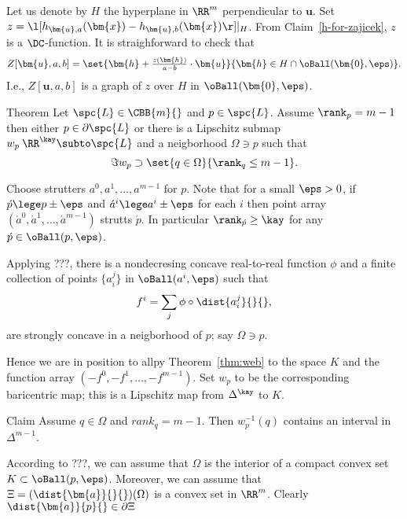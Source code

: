 Let us denote by $H$ the hyperplane in $\RR^m$ perpendicular to $\bm{u}$.
Set $z=\l[h_{\bm{u}, a}(\bm{x})-h_{\bm{u}, b}(\bm{x})\r]|_H$.
From Claim~\ref{h-for-zajicek}, $z$ is a $\DC$-function.
It is straighforward to check that
$$ Z[\bm{u},a,b]
=\set{\bm{h}+\tfrac{z(\bm{h})}{a-b}\cdot\bm{u}}{\bm{h}\in H\cap\oBall(\bm{0},\eps)}.$$
I.e., $Z[\bm{u},a,b]$ is a graph of $z$ over $H$ in $\oBall(\bm{0},\eps)$.
\claimqeds
















\begin{thm}{Theorem}
Let $\spc{L}\in\CBB{m}{}$ and $p\in\spc{L}$.
Assume $\rank_p=m-1$ then either $p\in\partial\spc{L}$
or there is a Lipschitz submap 
$w_p\:\RR^\kay\subto\spc{L}$
and a neigborhood $\Omega\ni p$
such that 
$$\Im w_p
\supset
\set{q\in \Omega}{\rank_q\le m-1}.
$$ 
\end{thm}

Choose strutters $a^0,a^1,\dots,a^{m-1}$ for $p$.
Note that for a small $\eps>0$,
if  $\acute p\lege p\pm\eps$ and $\acute a^i\lege a^i\pm\eps$ for each $i$
then point array $(\acute a^0,\acute a^1,\dots,\acute a^{m-1})$ strutts $\acute p$.
In particular $\rank_{\acute p}\ge \kay$ for any $\acute p\in\oBall(p,\eps)$.

Applying ???,
there is a nondecresing concave real-to-real function $\phi$ and 
a finite collection of points  $\{a^j_i\}$ in $\oBall(a^i,\eps)$
such that 
$$f^i=\sum_j\phi\circ\dist{a^j_i}{}{},$$
are strongly concave in a neigborhood of $p$; say $\Omega\ni p$.

Hence we are in position to allpy Theorem~\ref{thm:web} to the space $K$ 
and the function array $(-f^0,-f^1,\dots,-f^{m-1})$.
Set $w_p$ to be the corresponding baricentric map;
this is a Lipschitz map from $\Delta^\kay$ to $K$.

\begin{clm}{Claim}
Assume $q\in \Omega$ and $rank_q=m-1$.
Then $w_p^{-1}(q)$ contains an interval in $\Delta^{m-1}$. 
\end{clm}
 

According to ???,
we can assume that $\Omega$ is the interior of 
a compact convex set $K\subset \oBall(p,\eps)$.
Moreover, 
we can assume that $\Xi=(\dist{\bm{a}}{}{})(\Omega)$ is a convex set in $\RR^m$.
Clearly $\dist{\bm{a}}{p}{}\in\partial \Xi$
\qeds


















